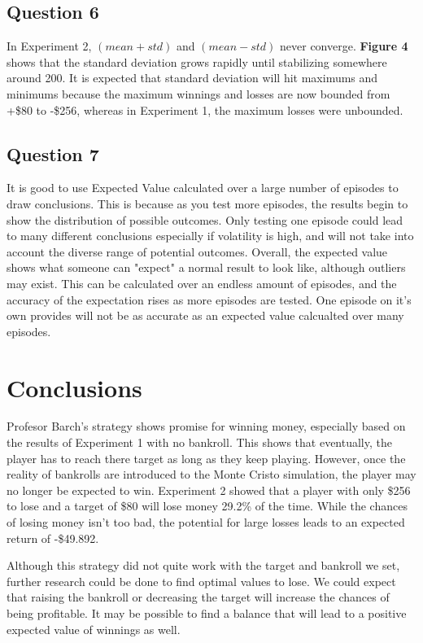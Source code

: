 \documentclass[
	letterpaper, %
]{jdf}
\begin{document}
\subsection{Question 6}
In Experiment 2, \((mean + std)\) and \((mean - std)\) never converge.
\textbf{Figure 4} shows that the standard deviation grows rapidly until stabilizing somewhere around 200.
It is expected that standard deviation will hit maximums and minimums because the maximum winnings and losses are now bounded from +\$80 to -\$256,
whereas in Experiment 1, the maximum losses were unbounded.

\subsection{Question 7}
It is good to use Expected Value calculated over a large number of episodes to draw conclusions.
This is because as you test more episodes, the results begin to show the distribution of possible outcomes.
Only testing one episode could lead to many different conclusions especially if volatility is high, and will not take into account the diverse range of potential outcomes.
Overall, the expected value shows what someone can "expect" a normal result to look like, although outliers may exist. 
This can be calculated over an endless amount of episodes, and the accuracy of the expectation rises as more episodes are tested.
One episode on it's own provides will not be as accurate as an expected value calcualted over many episodes.

\section{Conclusions}

Profesor Barch's strategy shows promise for winning money, especially based on the results of Experiment 1 with no bankroll.
This shows that eventually, the player has to reach there target as long as they keep playing.
However, once the reality of bankrolls are introduced to the Monte Cristo simulation, the player may no longer be expected to win.
Experiment 2 showed that a player with only \$256 to lose and a target of \$80 will lose money 29.2\% of the time.
While the chances of losing money isn't too bad, the potential for large losses leads to an expected return of -\$49.892.

Although this strategy did not quite work with the target and bankroll we set, further research could be done to find optimal values to lose.
We could expect that raising the bankroll or decreasing the target will increase the chances of being profitable.
It may be possible to find a balance that will lead to a positive expected value of winnings as well.
\end{document}
